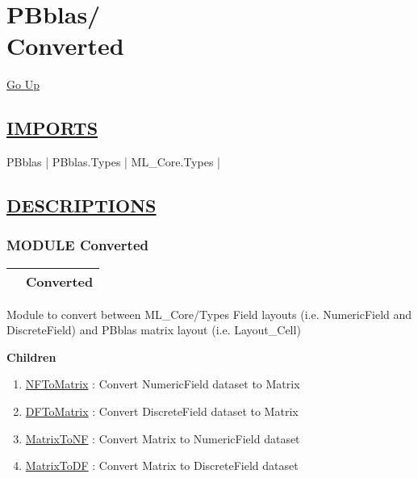 \chapter*{\color{headfile}
{\large PBblas\slash\hspace{0pt}}
 \\
Converted
}
\hypertarget{ecldoc:toc:PBblas.Converted}{}
\hyperlink{ecldoc:toc:root/PBblas}{Go Up}

\section*{\underline{\textsf{IMPORTS}}}
\begin{doublespace}
{\large
PBblas |
PBblas.Types |
ML\_Core.Types |
}
\end{doublespace}

\section*{\underline{\textsf{DESCRIPTIONS}}}
\subsection*{\textsf{\colorbox{headtoc}{\color{white} MODULE}
Converted}}

\hypertarget{ecldoc:PBblas.Converted}{}

{\renewcommand{\arraystretch}{1.5}
\begin{tabularx}{\textwidth}{|>{\raggedright\arraybackslash}l|X|}
\hline
\hspace{0pt}\mytexttt{\color{red} } & \textbf{Converted} \\
\hline
\end{tabularx}
}

\par
Module to convert between ML\_Core/Types Field layouts (i.e. NumericField and DiscreteField) and PBblas matrix layout (i.e. Layout\_Cell)


\textbf{Children}
\begin{enumerate}
\item \hyperlink{ecldoc:pbblas.converted.nftomatrix}{NFToMatrix}
: Convert NumericField dataset to Matrix
\item \hyperlink{ecldoc:pbblas.converted.dftomatrix}{DFToMatrix}
: Convert DiscreteField dataset to Matrix
\item \hyperlink{ecldoc:pbblas.converted.matrixtonf}{MatrixToNF}
: Convert Matrix to NumericField dataset
\item \hyperlink{ecldoc:pbblas.converted.matrixtodf}{MatrixToDF}
: Convert Matrix to DiscreteField dataset
\end{enumerate}

